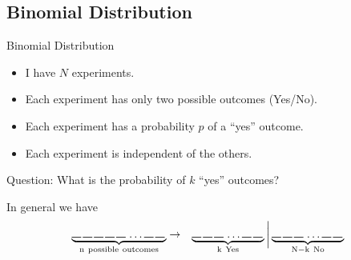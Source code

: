 \subsection{Binomial Distribution}

\begin{frame}{Binomial Distribution}

  \begin{itemize}
  \item I have $N$ experiments.
  \item Each experiment has only two possible outcomes (Yes/No).
  \item Each experiment has a probability $p$ of a ``yes'' outcome.
  \item Each experiment is independent of the others.
  \end{itemize}

  \vfill

  Question: What is the probability of $k$ ``yes'' outcomes?

  \vfill

  In general we have 
  \begin{eqnarray*}
    \underbrace{
      \rule{.3cm}{.2mm} \hspace{.05cm} 
      \rule{.3cm}{.2mm} \hspace{.05cm} 
      \rule{.3cm}{.2mm} \hspace{.05cm} 
      \rule{.3cm}{.2mm} \hspace{.05cm} 
      \rule{.3cm}{.2mm} \hspace{.05cm} \ldots
      \rule{.3cm}{.2mm} \hspace{.05cm} 
      \rule{.3cm}{.2mm} \hspace{.05cm}}_{\mathrm{n~possible~outcomes}}
    & \rightarrow & 
    \underbrace{
      \rule{.3cm}{.2mm} \hspace{.05cm} 
      \rule{.3cm}{.2mm} \hspace{.05cm} 
      \rule{.3cm}{.2mm} \hspace{.05cm} \ldots
      \rule{.3cm}{.2mm} \hspace{.05cm} 
      \rule{.3cm}{.2mm} \hspace{.05cm}}_{\mathrm{k~Yes}}
    \bigg|
    \underbrace{
      \rule{.3cm}{.2mm} \hspace{.05cm} 
      \rule{.3cm}{.2mm} \hspace{.05cm} 
      \rule{.3cm}{.2mm} \hspace{.05cm} \ldots
      \rule{.3cm}{.2mm} \hspace{.05cm} 
      \rule{.3cm}{.2mm} \hspace{.05cm}}_{\mathrm{N-k~No}}
  \end{eqnarray*}



  
\end{frame}

